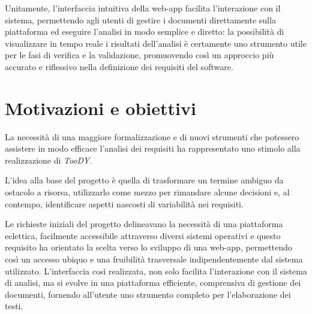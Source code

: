 \documentclass[12pt]{report}
\newcommand{\toody}{\textsl{TooDY}\xspace}
\newcommand{\flask}{\textsl{Flask}\xspace}
\begin{document}
Unitamente, l'interfaccia intuitiva della web-app facilita l'interazione con il sistema, permettendo agli utenti di gestire i documenti direttamente sulla piattaforma ed eseguire l'analisi in modo semplice e diretto: la possibilità di visualizzare in tempo reale i risultati dell'analisi è certamente uno strumento utile per le fasi di verifica e la validazione, promuovendo così un approccio più accurato e riflessivo nella definizione dei requisiti del software.



\section{Motivazioni e obiettivi}
La necessità di una maggiore formalizzazione e di nuovi strumenti che potessero assistere in modo efficace l'analisi dei requisiti ha rappresentato uno stimolo alla realizzazione di \toody.

L’idea alla base del progetto è quella di trasformare un termine ambiguo da ostacolo a risorsa, utilizzarlo come mezzo per rimandare alcune decisioni e, al contempo, identificare aspetti nascosti di variabilità nei requisiti.

Le richieste iniziali del progetto delineavano la necessità di una piattaforma eclettica, facilmente accessibile attraverso diversi sistemi operativi e questo requisito ha orientato la scelta verso lo sviluppo di una web-app, permettendo così un accesso ubiquo e una fruibilità trasversale indipendentemente dal sistema utilizzato. L'interfaccia così realizzata, non solo facilita l'interazione con il sistema di analisi, ma si evolve in una piattaforma efficiente, comprensiva di gestione dei documenti, fornendo all'utente uno strumento completo per l'elaborazione dei testi.
\end{document}

